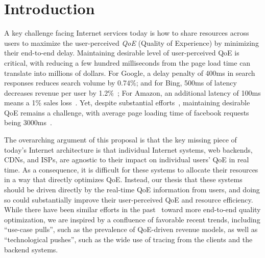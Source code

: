 
\section{Introduction}

\noindent A key challenge facing Internet services today is how to share resources across users to maximize the user-perceived {\em QoE} (Quality of Experience) by minimizing their end-to-end delay.
Maintaining desirable level of user-perceived QoE is critical, with reducing a few hundred milliseconds from the page load time can translate into millions of dollars.
For Google, a delay penalty of 400ms in search responses reduces search volume by 0.74\%; and for Bing, 500ms of latency decreases revenue per user by 1.2\%~\cite{google-revenue,bing-revenue}; For Amazon, an additional latency of 100ms means a 1\% sales loss~\cite{amazon-revenue}.
Yet, despite substantial efforts~\cite{shandian,gaze,rosen2017push,jalaparti2013speeding}, maintaining desirable QoE remains a challenge, with average page loading time of facebook requests being 3000ms~\cite{mystery}.

The overarching argument of this proposal is that the key missing piece of today's Internet architecture is that individual Internet systems, \eg web backends, CDNs, and ISPs, are agnostic to their impact on individual users' QoE in real time. 
As a consequence, it is difficult for these systems to allocate their resources in a way that directly optimizes QoE. 
Instead, our thesis that these systems should be driven directly by the real-time QoE information from users, and doing so could substantially improve their user-perceived QoE and resource efficiency.
While there have been similar efforts in the past~\cite{alto,frank2013pushing,xie2008p4p,jiang2009cooperative} toward more end-to-end quality optimization, we are inspired by a confluence of favorable recent trends, including ``use-case pulls'', such as the prevalence of QoE-driven revenue models, as well as ``technological pushes'', such as the wide use of tracing from the clients and the backend systems. 

